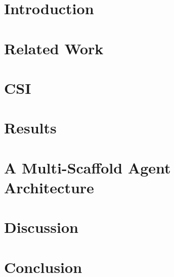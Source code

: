 \documentclass[9pt]{extarticle}
\begin{document}
\section{Introduction}\label{sec:introduction}


\section{Related Work}\label{sec:related}


\section{CSI}\label{sec:csi}


% 

\section{Results}\label{sec:results}


\section{A Multi-Scaffold Agent Architecture}\label{sec:multiagent}


\section{Discussion}\label{sec:discussion}


\section{Conclusion}\label{sec:conclusion}




\onecolumn

\end{document}
